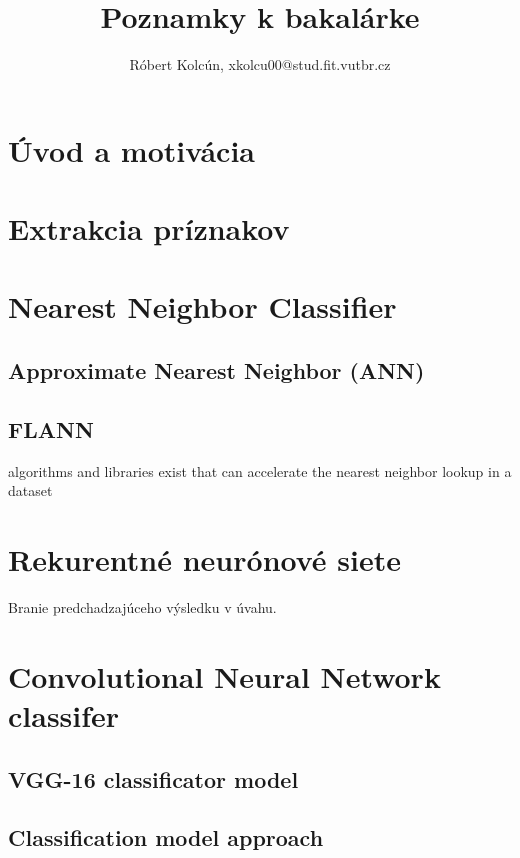 \documentclass[10pt,a4paper]{article}
\begin{document}
\title{Poznamky k bakalárke}
\author{Róbert Kolcún, xkolcu00@stud.fit.vutbr.cz}
\maketitle


\section{Úvod a motivácia}



\section{Extrakcia príznakov}



\section{Nearest Neighbor Classifier}

\subsection{Approximate Nearest Neighbor (ANN)}

\subsection{FLANN}
algorithms and libraries exist that can accelerate the nearest neighbor lookup in a dataset



\section{Rekurentné neurónové siete}
Branie predchadzajúceho výsledku v úvahu.



\section{Convolutional Neural Network classifer}

\subsection{VGG-16 classificator model}

\subsection{Classification model approach}
\end{document}
